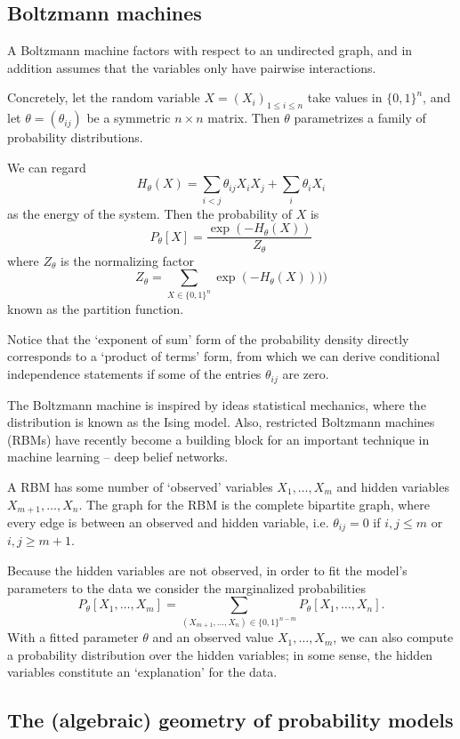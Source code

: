 \documentclass[11pt]{article}
\begin{document}
\subsection{Boltzmann machines}

A Boltzmann machine factors with respect to an undirected graph, and in addition
assumes that the variables only have pairwise interactions.

Concretely, let the random variable $X = (X_i)_{1 \le i \le n}$ take values in
$\{0,1\}^n$, and let $\theta = (\theta_{ij})$ be a symmetric $n \times n$
matrix.  Then $\theta$ parametrizes a family of probability distributions.

We can regard 
\[
    H_\theta(X) = \sum_{i < j} \theta_{ij} X_i X_j + \sum_i \theta_i X_i
\]
as the energy of the system.  Then the probability of $X$ is
\[
    P_\theta[X] = \frac{\exp(- H_\theta(X))}{Z_\theta}
\]
where $Z_\theta$ is the normalizing factor
\[
    Z_\theta = \sum_{X \in \{0,1\}^n} \exp(-H_\theta(X))))
\]
known as the partition function.

Notice that the `exponent of sum' form of the probability density directly
corresponds to a `product of terms' form, from which we can derive conditional
independence statements if some of the entries $\theta_{ij}$ are zero.

The Boltzmann machine is inspired by ideas statistical mechanics, where the
distribution is known as the Ising model.  Also, restricted Boltzmann machines
(RBMs) have recently become a building block for an important technique in
machine learning -- deep belief networks.

A RBM has some number of `observed' variables $X_1, \ldots, X_m$ and hidden
variables $X_{m+1}, \ldots, X_n$.  The graph for the RBM is the complete
bipartite graph, where every edge is between an observed and hidden variable,
i.e. $\theta_{ij} = 0$ if $i,j \le m$ or $i,j \ge m+1$.

Because the hidden variables are not observed, in order to fit the model's
parameters to the data we consider the marginalized probabilities
\[
    P_\theta[X_1, \ldots, X_m] = \sum_{(X_{m+1}, \ldots, X_n) \in \{0,1\}^{n-m}}
        P_\theta[X_1, \ldots, X_n].
\]
With a fitted parameter $\theta$ and an observed value $X_1, \ldots, X_m$, we can
also compute a probability distribution over the hidden variables; in some
sense, the hidden variables constitute an `explanation' for the data.


\subsection{The (algebraic) geometry of probability models}
\end{document}
